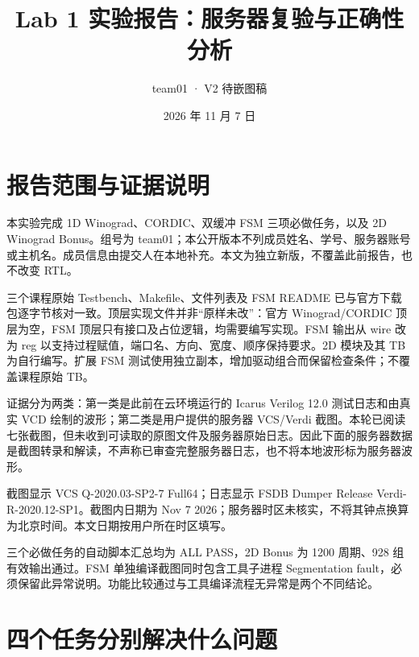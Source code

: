 \documentclass[
  10pt,
  a4paper,
]{article}
\title{Lab 1 实验报告：服务器复验与正确性分析}
\subtitle{team01 · V2 待嵌图稿}
\author{}
\date{2026 年 11 月 7 日}
\begin{document}
\maketitle

\section{报告范围与证据说明}\label{ux62a5ux544aux8303ux56f4ux4e0eux8bc1ux636eux8bf4ux660e}

本实验完成 1D Winograd、CORDIC、双缓冲 FSM 三项必做任务，以及 2D
Winograd Bonus。组号为
team01；本公开版本不列成员姓名、学号、服务器账号或主机名。成员信息由提交人在本地补充。本文为独立新版，不覆盖此前报告，也不改变
RTL。

三个课程原始 Testbench、Makefile、文件列表及 FSM README
已与官方下载包逐字节核对一致。顶层实现文件并非``原样未改''：官方
Winograd/CORDIC 顶层为空，FSM
顶层只有接口及占位逻辑，均需要编写实现。FSM 输出从 wire 改为 reg
以支持过程赋值，端口名、方向、宽度、顺序保持要求。2D 模块及其 TB
为自行编写。扩展 FSM
测试使用独立副本，增加驱动组合而保留检查条件；不覆盖课程原始 TB。

证据分为两类：第一类是此前在云环境运行的 Icarus Verilog 12.0
测试日志和由真实 VCD 绘制的波形；第二类是用户提供的服务器 VCS/Verdi
截图。本轮已阅读七张截图，但未收到可读取的原图文件及服务器原始日志。因此下面的服务器数据是截图转录和解读，不声称已审查完整服务器日志，也不将本地波形标为服务器波形。

截图显示 VCS Q-2020.03-SP2-7 Full64；日志显示 FSDB Dumper Release
Verdi-R-2020.12-SP1。截图内日期为 Nov 7
2026；服务器时区未核实，不将其钟点换算为北京时间。本文日期按用户所在时区填写。

三个必做任务的自动脚本汇总均为 ALL PASS，2D Bonus 为 1200 周期、928
组有效输出通过。FSM 单独编译截图同时包含工具子进程 Segmentation
fault，必须保留此异常说明。功能比较通过与工具编译流程无异常是两个不同结论。

\section{四个任务分别解决什么问题}\label{ux56dbux4e2aux4efbux52a1ux5206ux522bux89e3ux51b3ux4ec0ux4e48ux95eeux9898}
\end{document}
